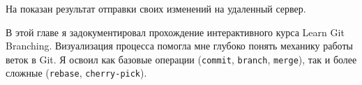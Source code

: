\label{fig:lgb_clone}

На  показан результат отправки своих изменений на удаленный сервер.

\label{fig:lgb_push}


В этой главе я задокументировал прохождение интерактивного курса Learn Git Branching.
Визуализация процесса помогла мне глубоко понять механику работы веток в Git.
Я освоил как базовые операции (\texttt{commit}, \texttt{branch}, \texttt{merge}), так и более сложные (\texttt{rebase}, \texttt{cherry-pick}).
